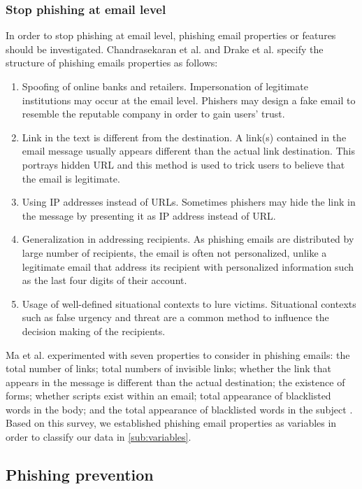 \subsubsection{\label{sub:Stop-phishing-at}Stop phishing at email level}

In order to stop phishing at email level, phishing email properties
or features should be investigated. Chandrasekaran et al. and Drake
et al. \citep{chandrasekaran:2006,drake2004anatomy} specify the structure
of phishing emails properties as follows:
\begin{enumerate}
\item Spoofing of online banks and retailers. Impersonation of legitimate
institutions may occur at the email level. Phishers may design a fake
email to resemble the reputable company in order to gain users' trust.
\item Link in the text is different from the destination. A link(s) contained
in the email message usually appears different than the actual link
destination. This portrays hidden URL and this method is used to trick
users to believe that the email is legitimate.
\item Using IP addresses instead of URLs. Sometimes phishers may hide the
link in the message by presenting it as IP address instead of URL.
\item Generalization in addressing recipients. As phishing emails are distributed
by large number of recipients, the email is often not personalized,
unlike a legitimate email that address its recipient with personalized
information such as the last four digits of their account.
\item Usage of well-defined situational contexts to lure victims. Situational
contexts such as false urgency and threat are a common method to influence
the decision making of the recipients.
\end{enumerate}
Ma et al. experimented with seven properties to consider in phishing
emails: the total number of links; total numbers of invisible links;
whether the link that appears in the message is different than the
actual destination; the existence of forms; whether scripts exist
within an email; total appearance of blacklisted words in the body;
and the total appearance of blacklisted words in the subject \citep{ma2009detecting}.
Based on this survey, we established phishing email properties as
variables in order to classify our data in \autoref{sub:variables}.


\subsection{Phishing prevention}

